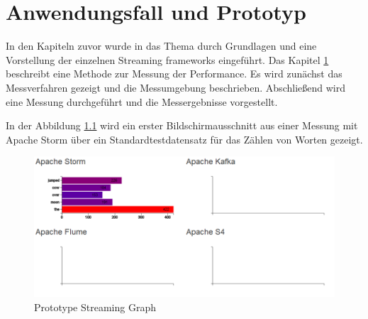 \chapter{Anwendungsfall und Prototyp}
\label{chapter:prototype}

In den Kapiteln zuvor wurde in das Thema durch Grundlagen und eine Vorstellung der einzelnen Streaming frameworks eingeführt. Das Kapitel \ref{chapter:prototype} beschreibt eine Methode zur Messung der Performance. Es wird zunächst das Messverfahren gezeigt und die Messumgebung beschrieben. Abschließend wird eine Messung durchgeführt und die Messergebnisse vorgestellt.

In der Abbildung \ref{fig:prototypeStreamingGraph} wird ein erster Bildschirmausschnitt aus einer Messung mit Apache Storm über ein Standardtestdatensatz für das Zählen von Worten gezeigt.

\begin{figure}[htb!]
\centering
\includegraphics[width=1.0\textwidth]{bilder/PrototypeStreamingGraph.png}
\caption{Prototype Streaming Graph
\label{fig:prototypeStreamingGraph}}
\end{figure}


